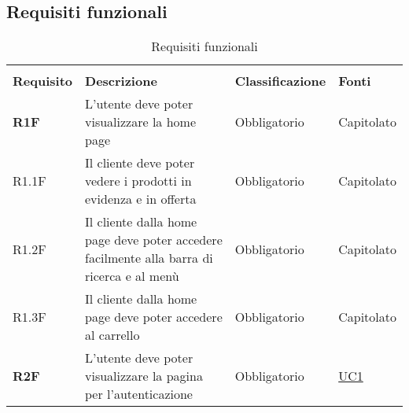 \subsection{Requisiti funzionali}
\begin{center}
    \centering
    \renewcommand{\arraystretch}{1.8}
    \label{tab:RequisitiFunzionali}
    \begin{longtable}[!h]{p{50px} p{245px} p{75px} p{50px}}
        \rowcolor{white}\caption{Requisiti funzionali}                                                                                                                                                                                                                          \\
        \rowcolor{logo!70} \textbf{Requisito} & \textbf{Descrizione}                                                                                                                                & \textbf{Classificazione} & \textbf{Fonti}                                 \\
        \textbf{R1F}                          & L'utente deve poter visualizzare la home page                                                                                                       & Obbligatorio             & Capitolato                                     \\
        R1.1F                                 & Il cliente deve poter vedere i prodotti in evidenza e in offerta                                                                                    & Obbligatorio             & Capitolato                                     \\
        R1.2F                                 & Il cliente dalla home page deve poter accedere facilmente alla barra di ricerca e al menù                                                           & Obbligatorio             & Capitolato                                     \\
        R1.3F                                 & Il cliente dalla home page deve poter accedere al carrello                                                                                          & Obbligatorio             & Capitolato                                     \\
        \textbf{R2F}                          & L'utente deve poter visualizzare la pagina per l'autenticazione                                                                                     & Obbligatorio             & \hyperref[sec:UC1]{UC1}                        \\

\end{longtable}
\end{center}
